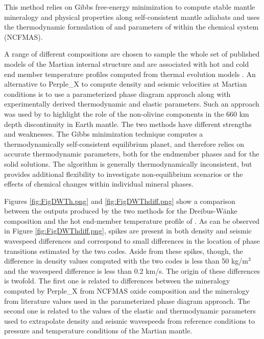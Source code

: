 This method relies on Gibbs free-energy minimization to compute stable mantle mineralogy and physical properties along self-consistent mantle adiabats and uses the thermodynamic formulation of \cite{Stixrude2005} and parameters of \cite{Stixrude&Lithgow-Bertelloni2011} within the chemical system  (NCFMAS).

A range of different compositions are chosen to sample the whole set of published models of the Martian internal structure \citep[see][]{Panning2016} and are associated with hot and cold end member temperature profiles computed from thermal evolution models \citep{Plesa2016}. An alternative to Perple\_X to compute density and seismic velocities at Martian conditions is to use a parameterized phase diagram approach along with experimentally derived thermodynamic and elastic parameters. Such an approach was used by \cite{Vacher1998} to highlight the role of the non-olivine components in the 660 km depth discontinuity in Earth mantle. The two methods have different strengths and weaknesses. The Gibbs minimization technique computes a thermodynamically self-consistent equilibrium planet, and therefore relies on accurate thermodynamic parameters, both for the endmember phases and for the solid solutions. The \cite{Vacher1998} algorithm is generally thermodynamically inconsistent, but provides additional flexibility to investigate non-equilibrium scenarios or the effects of chemical changes within individual mineral phases.

Figures \ref{fig:FigDWTh.png} and \ref{fig:FigDWThdiff.png} show a comparison between the outputs produced by the two methods for the Dreibus-W\"{a}nke composition \citep{Dreibus&Wanke1985} and the hot end-member temperature profile of \cite{Plesa2016}. As can be observed in Figure \ref{fig:FigDWThdiff.png}, spikes are present in both density and seismic wavespeed differences and correspond to small differences in the location of phase transitions estimated by the two codes. Aside from these spikes, though, the difference in density values computed with the two codes is less than 50 kg/m$^3$ and the wavespeed difference is less than 0.2 km/s. The origin of these differences is twofold. The first one is related to differences between the mineralogy computed by Perple\_X from NCFMAS oxide composition and the mineralogy from literature values used in the parameterized phase diagram approach. The second one is related to the values of the elastic and thermodynamic parameters used to extrapolate density and seismic wavespeeds from reference conditions to pressure and temperature conditions of the Martian mantle.

